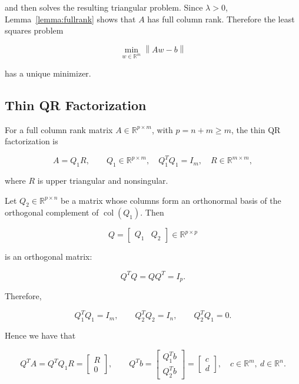 \documentclass[11pt,a4paper]{article}
\newcommand{\R}{\mathbb{R}}
\newcommand{\norm}[1]{\left\|#1\right\|}
\begin{document}
and then solves the resulting triangular problem. Since $\lambda > 0$, 
Lemma~\ref{lemma:fullrank} shows that $A$ has full column rank. Therefore the 
least squares problem

\begin{equation}
    \min_{w\in\R^m} \norm{Aw-b}
\end{equation}

has a unique minimizer.

\subsection{Thin QR Factorization}

For a full column rank matrix $A\in\R^{p\times m}$, with $p=n+m\geq m$, the thin QR 
factorization is

\begin{equation}
\label{eq:thin_qr}
    A = Q_1 R,
    \qquad
    Q_1 \in \R^{p\times m}, \quad Q_1^T Q_1 = I_m,
    \quad
    R \in \R^{m\times m},
\end{equation}

where $R$ is upper triangular and nonsingular.


Let $Q_2 \in \R^{p\times n}$ be a matrix whose columns form an orthonormal basis of the orthogonal
complement of $\operatorname{col}(Q_1)$. Then

\begin{equation}
    Q =
    \begin{bmatrix}
    Q_1 & Q_2
    \end{bmatrix}
    \in \R^{p\times p}
\end{equation}

is an orthogonal matrix:

\begin{equation}
    Q^TQ = QQ^T = I_p.
\end{equation}

Therefore,

\begin{equation}
    Q_1^TQ_1 = I_m,
    \qquad
    Q_2^TQ_2 = I_{n},
    \qquad
    Q_2^TQ_1 = 0.
\end{equation}

Hence we have that

\begin{equation}
    Q^T A = Q^T Q_1 R =
    \begin{bmatrix}
        R \\ 0
    \end{bmatrix},
    \qquad
    Q^T b =
    \begin{bmatrix}
        Q_1^T b \\ Q_2^T b
    \end{bmatrix} =
    \begin{bmatrix}
        c \\ d
    \end{bmatrix},
    \quad c\in\R^m,\ d\in\R^{n}.
\end{equation}
\end{document}
